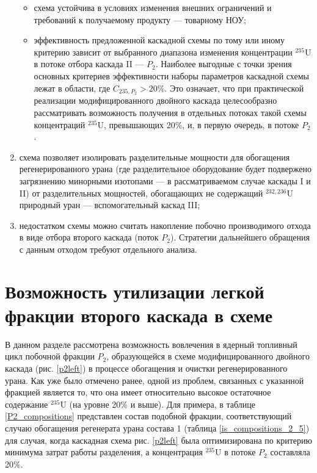 \begin{enumerate}
\begin{itemize}
        \item схема устойчива в условиях изменения внешних ограничений и требований к получаемому продукту --- товарному НОУ;
        \item эффективность предложенной каскадной схемы по тому или иному критерию зависит от выбранного диапазона изменения концентрации $^{235}$U в потоке отбора каскада II --- $P_2$. Наиболее выгодные с точки зрения основных критериев эффективности наборы параметров каскадной схемы лежат в области, где $C_{235,{P_2}} > 20\%$. Это означает, что при практической реализации модифицированного двойного каскада целесообразно рассматривать возможность получения в отдельных потоках такой схемы концентраций $^{235}$U, превышающих 20\%, и, в первую очередь, в потоке $P_2$.
    \end{itemize}       
    \item схема позволяет изолировать разделительные мощности для обогащения регенерированного урана (где разделительное оборудование будет подвержено загрязнению минорными изотопами --- в рассматриваемом случае каскады I и II) от разделительных мощностей, обогащающих не содержащий $^{232,236}$U природный уран --- вспомогательный каскад III;
    \item недостатком схемы можно считать накопление побочно производимого отхода в виде отбора второго каскада (поток $P_2$). Стратегии дальнейшего обращения с данным отходом требуют отдельного анализа.
\end{enumerate}


\section{Возможность утилизации легкой фракции второго каскада в схеме}

В данном разделе рассмотрена возможность вовлечения в ядерный топливный цикл побочной фракции $P_2$, образующейся в схеме модифицированного двойного каскада (рис. \ref{p2left}) в процессе обогащения и очистки регенерированного урана. Как уже было отмечено ранее, одной из проблем, связанных с указанной фракцией является то, что она имеет относительно высокое остаточное содержание $^{235}$U (на уровне 20\% и выше). Для примера, в таблице \ref{P2_compositions} представлен состав подобной фракции, соответствующий случаю обогащения регенерата урана состава 1 (таблица \ref{is_compositions_2_5}) для случая, когда каскадная схема рис. \ref{p2left} была оптимизирована по критерию минимума затрат работы разделения, а концентрация $^{235}$U в потоке $P_2$ составляла 20\%. 

